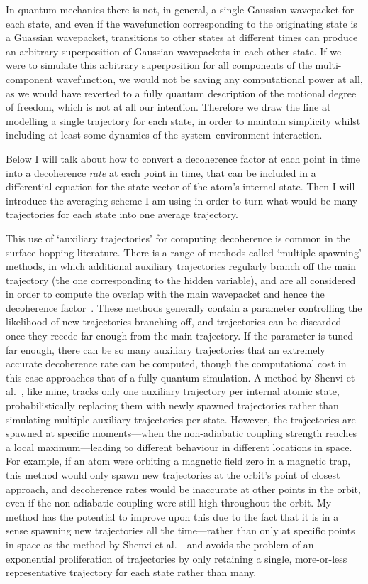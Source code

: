 In quantum mechanics there is not, in general, a single Gaussian wavepacket for each state, and even if the wavefunction corresponding to the originating state is a Guassian wavepacket, transitions to other states at different times can produce an arbitrary superposition of Gaussian wavepackets in each other state. If we were to simulate this arbitrary superposition for all components of the multi-component wavefunction, we would not be saving any computational power at all, as we would have reverted to a fully quantum description of the motional degree of freedom, which is not at all our intention. Therefore we draw the line at modelling a single trajectory for each state, in order to maintain simplicity whilst including at least some dynamics of the system--environment interaction.

Below I will talk about how to convert a decoherence factor at each point in time into a decoherence \emph{rate} at each point in time, that can be included in a differential equation for the state vector of the atom's internal state. Then I will introduce the averaging scheme I am using in order to turn what would be many trajectories for each state into one average trajectory.

This use of `auxiliary trajectories' for computing decoherence is common in the surface-hopping literature. There is a range of methods called `multiple spawning' methods, in which additional auxiliary trajectories regularly branch off the main trajectory (the one corresponding to the hidden variable), and are all considered in order to compute the overlap with the main wavepacket and hence the decoherence factor~\cite{doi:10.1021/jp994174i, doi:10.1063/1.476142, doi:10.1063/1.3103930}. These methods generally contain a parameter controlling the likelihood of new trajectories branching off, and trajectories can be discarded once they recede far enough from the main trajectory. If the parameter is tuned far enough, there can be so many auxiliary trajectories that an extremely accurate decoherence rate can be computed, though the computational cost in this case approaches that of a fully quantum simulation. A method by Shenvi et al.~\cite{doi:10.1063/1.3575588}, like mine, tracks only one auxiliary trajectory per internal atomic state, probabilistically replacing them with newly spawned trajectories rather than simulating multiple auxiliary trajectories per state. However, the trajectories are spawned at specific moments---when the non-adiabatic coupling strength reaches a local maximum---leading to different behaviour in different locations in space. For example, if an atom were orbiting a magnetic field zero in a magnetic trap, this method would only spawn new trajectories at the orbit's point of closest approach, and decoherence rates would be inaccurate at other points in the orbit, even if the non-adiabatic coupling were still high throughout the orbit. My method has the potential to improve upon this due to the fact that it is in a sense spawning new trajectories all the time---rather than only at specific points in space as the method by Shenvi et al.---and avoids the problem of an exponential proliferation of trajectories by only retaining a single, more-or-less representative trajectory for each state rather than many. 


